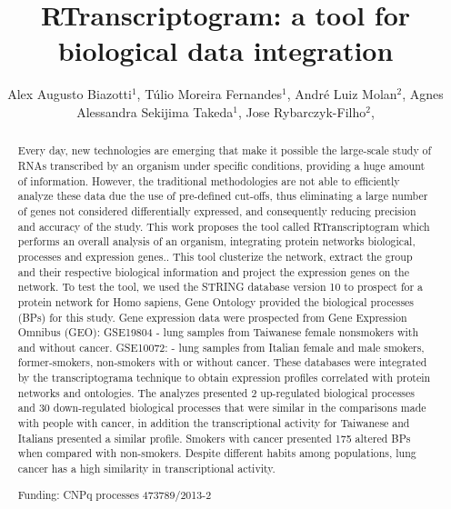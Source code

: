 \documentclass[twoside]{article}
\title{\vspace{-15mm}\fontsize{24pt}{10pt}\selectfont\textbf{ RTranscriptogram: a tool for biological data integration }} %
\author{ Alex Augusto Biazotti$^{1}$, Túlio Moreira Fernandes$^{1}$, André Luiz Molan$^{2}$, Agnes Alessandra Sekijima Takeda$^{1}$, Jose Rybarczyk-Filho$^{2}$, }
\affil{ 1 Instituto de Biociências de Botucatu - UNESP

2 UNESP

 }
\date{}
\begin{document}
  
  
  \maketitle %
  
  
  \thispagestyle{fancy} %
  
  
  \begin{abstract}
  Every day, new technologies are emerging that make it possible the large-scale study of RNAs transcribed by an organism under specific conditions, providing a huge amount of information. However, the traditional methodologies are not able to efficiently analyze these data due the use of pre-defined cut-offs, thus eliminating a large number of genes not considered differentially expressed, and consequently reducing precision and accuracy of the study. This work proposes the tool called RTranscriptogram which performs an overall analysis of an organism, integrating protein networks biological,  processes and expression genes.. This tool clusterize the network, extract the group and their respective biological information and project the expression genes on the network.  To test the tool, we used the STRING database version 10 to prospect for a protein network for Homo sapiens, Gene Ontology provided the biological processes (BPs) for this study. Gene expression data were prospected from Gene Expression Omnibus (GEO): GSE19804 - lung samples from Taiwanese female nonsmokers with and without cancer. GSE10072: - lung samples from Italian female and male smokers, former-smokers, non-smokers with or without cancer. These databases were integrated by the transcriptograma technique to obtain expression profiles correlated with protein networks and ontologies. The analyzes presented 2 up-regulated biological processes and 30 down-regulated biological processes that were similar in the comparisons made with people with cancer, in addition the transcriptional activity for Taiwanese and Italians presented a similar profile. Smokers with cancer presented 175 altered BPs when compared with non-smokers. Despite different habits among populations, lung cancer has a high similarity in transcriptional activity.
  
  Funding: CNPq processes 473789/2013-2 \\ 
  \end{abstract}
  
\end{document}
